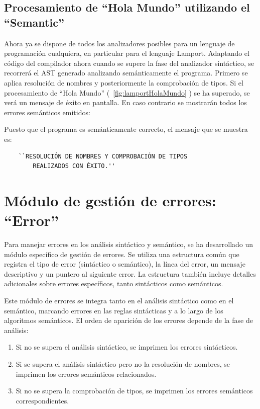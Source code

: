 \subsection{Procesamiento de ``Hola Mundo'' utilizando el ``Semantic''}
Ahora ya se dispone de todos los analizadores posibles para un lenguaje de programación cualquiera, en particular para el lenguaje Lamport. Adaptando el código del compilador ahora cuando se supere la fase del analizador sintáctico, se recorrerá el AST generado analizando semánticamente el programa. Primero se aplica resolución de nombres y posteriormente la comprobación de tipos. Si el procesamiento de ``Hola Mundo'' (~\ref{fig:lamportHolaMundo} ) se ha superado, se verá un mensaje de éxito en pantalla. En caso contrario se mostrarán todos los errores semánticos emitidos:



\noindent
Puesto que el programa es semánticamente correcto, el mensaje que se muestra es:
\begin{verbatim}
    ``RESOLUCIÓN DE NOMBRES Y COMPROBACIÓN DE TIPOS 
        REALIZADOS CON ÉXITO.''
\end{verbatim}

\section{Módulo de gestión de errores: ``Error''}\label{sec:implementacionError}
Para manejar errores en los análisis sintáctico y semántico, se ha desarrollado un módulo específico de gestión de errores. Se utiliza una estructura común  que registra el tipo de error (sintáctico o semántico), la línea del error, un mensaje descriptivo y un puntero al siguiente error. La estructura también incluye detalles adicionales sobre errores específicos, tanto sintácticos como semánticos.

Este módulo de errores se integra tanto en el análisis sintáctico como en el semántico, marcando errores en las reglas sintácticas y a lo largo de los algoritmos semánticos. El orden de aparición de los errores depende de la fase de análisis:

\begin{enumerate}
    \item Si no se supera el análisis sintáctico, se imprimen los errores sintácticos.
    \item Si se supera el análisis sintáctico pero no la resolución de nombres, se imprimen los errores semánticos relacionados.
    \item Si no se supera la comprobación de tipos, se imprimen los errores semánticos correspondientes.
\end{enumerate}


